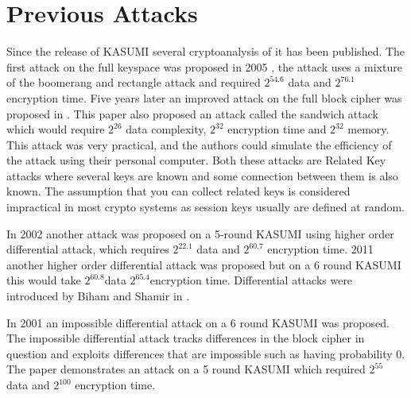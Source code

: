 \section{Previous Attacks}
Since the release of KASUMI several cryptoanalysis of it has been published.
The first attack on the full keyspace was proposed in 2005 \cite{rect}, the attack
uses a mixture of the boomerang and rectangle
attack\cite{rectangle}\cite{boom} and required $2^{54.6}$ data and $2^{76.1}$ encryption time.
Five years later an improved attack on the full block cipher was proposed in \cite{sand}. This paper also proposed an attack called the sandwich attack which would require $2^{26}$ data complexity, $2^{32}$ encryption time and $2^{32}$ memory. This attack was very practical, and the authors could simulate the efficiency of the attack using their personal computer. Both these attacks are Related Key attacks\cite{relate} where several keys are known and some connection between them is also known. The assumption that you can collect related keys is considered impractical in most crypto systems as session keys usually are defined at random.

In 2002 another attack was proposed on a 5-round KASUMI\cite{single2002} using higher order differential attack, which requires  $2^{22.1}$ data and $2^{60.7}$ encryption time. 2011 another higher order differential attack was proposed but on a 6 round KASUMI\cite{single} this would take $2^{60.8}$data $2^{65.4}$encryption time. Differential attacks were introduced by Biham and Shamir in \cite{diff}.

In 2001 an impossible differential attack on a 6 round KASUMI was proposed\cite{imp}. The impossible differential attack tracks differences in the block cipher in question and exploits differences that are impossible such as having probability 0. The paper demonstrates an attack on a 5 round KASUMI which required $2^{55}$ data and $2^{100}$ encryption time.

